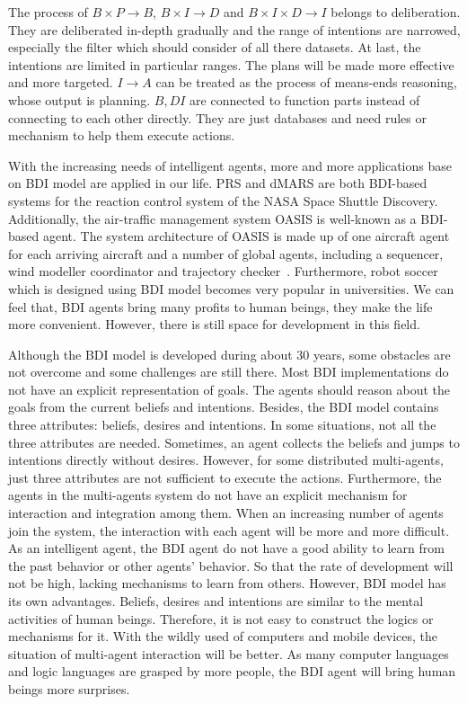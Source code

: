 The process of $B \times P \to B$, $B \times I \to D$ and $B \times I \times D \to I$ belongs to deliberation. They are deliberated in-depth gradually and the range of intentions are narrowed, especially the filter which should consider of all there datasets. At last, the intentions are limited in particular ranges. The plans will be made more effective and more targeted.  $I \to A $ can be treated as the process of means-ends reasoning, whose output is planning. $B,D I$ are connected to function parts instead of connecting to each other directly. They are just databases and need rules or mechanism to help them execute actions.

With the increasing needs of intelligent agents, more and more applications base on BDI model are applied in our life. PRS and dMARS are both BDI-based systems for the reaction control system of the NASA Space Shuttle Discovery. Additionally, the air-traffic management system OASIS is well-known as a BDI-based agent. The system architecture of OASIS is made up of one aircraft agent for each arriving aircraft and a number of global agents, including a sequencer, wind modeller coordinator and trajectory checker~\cite{Rao_BDITheory_1995}. Furthermore, robot soccer which is designed using BDI model becomes very popular in universities. We can feel that, BDI agents bring many profits to human beings, they make the life more convenient. However, there is still space for development in this field.

Although the BDI model is developed during about 30 years, some obstacles are not overcome and some challenges are still there. Most BDI implementations do not have an explicit representation of goals. The agents should reason about the goals from the current beliefs and intentions. Besides, the BDI model contains three attributes: beliefs, desires and intentions. In some situations, not all the three attributes are needed. Sometimes, an agent collects the beliefs and jumps to intentions directly without desires. However, for some distributed multi-agents, just three attributes are not sufficient to execute the actions.  Furthermore, the agents in the multi-agents system do not have an explicit mechanism for interaction and integration among them. When an increasing number of agents join the system, the interaction with each agent will be more and more difficult. As an intelligent agent, the BDI agent do not have a good ability to learn from the past behavior or other agents’ behavior. So that the rate of development will not be high, lacking mechanisms to learn from others. However, BDI model has its own advantages. Beliefs, desires and intentions are similar to the mental activities of human beings. Therefore, it is not easy to construct the logics or mechanisms for it. With the wildly used of computers and mobile devices, the situation of multi-agent interaction will be better. As many computer languages and logic languages are grasped by more people, the BDI agent will bring human beings more surprises.

